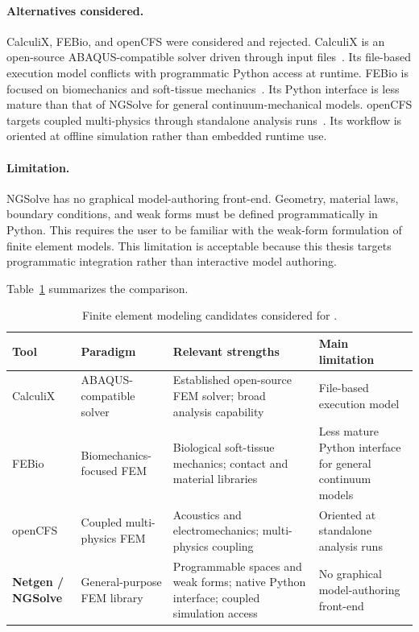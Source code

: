 \paragraph{Alternatives considered.}
CalculiX, FEBio, and openCFS were considered and rejected.
CalculiX is an open-source ABAQUS-compatible solver driven through input files~\cite{dhondt_calculix_2023}.
Its file-based execution model conflicts with programmatic Python access at runtime.
FEBio is focused on biomechanics and soft-tissue mechanics~\cite{maas_febio_2012}.
Its Python interface is less mature than that of NGSolve for general continuum-mechanical models.
openCFS targets coupled multi-physics through standalone analysis runs~\cite{schoder_opencfs_2025}.
Its workflow is oriented at offline simulation rather than embedded runtime use.

\paragraph{Limitation.}
NGSolve has no graphical model-authoring front-end.
Geometry, material laws, boundary conditions, and weak forms must be defined programmatically in Python.
This requires the user to be familiar with the weak-form formulation of finite element models.
This limitation is acceptable because this thesis targets programmatic integration rather than interactive model authoring.

Table~\ref{tab:fem_tool_comparison} summarizes the comparison.

\begin{table}[b]
  \centering
  \small
  \caption[Finite element modeling candidates]{Finite element modeling candidates considered for \syssimx{}.}
  \label{tab:fem_tool_comparison}
  \begin{tabular}{p{2.5cm} p{3.0cm} p{4.5cm} p{4.0cm}}
    \toprule
    \textbf{Tool}             & \textbf{Paradigm}           & \textbf{Relevant strengths}                                                            & \textbf{Main limitation}                  \\
    \midrule
    CalculiX                  & ABAQUS-compatible solver    & Established open-source \ac{FEM} solver; broad analysis capability                          & File-based execution model                \\
    \addlinespace
    FEBio                     & Biomechanics-focused \ac{FEM}    & Biological soft-tissue mechanics; contact and material libraries                       & Less mature Python interface for general continuum models \\
    \addlinespace
    openCFS                   & Coupled multi-physics \ac{FEM}   & Acoustics and electromechanics; multi-physics coupling                                 & Oriented at standalone analysis runs      \\
    \addlinespace
    \textbf{Netgen / NGSolve} & General-purpose \ac{FEM} library & Programmable spaces and weak forms; native Python interface; coupled simulation access & No graphical model-authoring front-end    \\
    \bottomrule
  \end{tabular}
\end{table}

